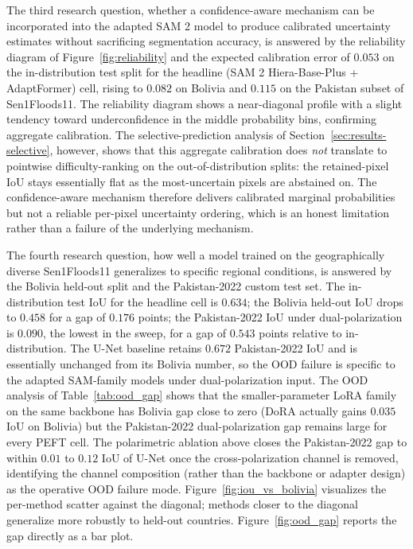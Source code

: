 \documentclass[11pt,a4paper,oneside]{report}
\begin{document}
The third research question, whether a confidence-aware mechanism can be incorporated into the adapted SAM 2 model to produce calibrated uncertainty estimates without sacrificing segmentation accuracy, is answered by the reliability diagram of Figure~\ref{fig:reliability} and the expected calibration error of $0.053$ on the in-distribution test split for the headline (SAM 2 Hiera-Base-Plus + AdaptFormer) cell, rising to $0.082$ on Bolivia and $0.115$ on the Pakistan subset of Sen1Floods11. The reliability diagram shows a near-diagonal profile with a slight tendency toward underconfidence in the middle probability bins, confirming aggregate calibration. The selective-prediction analysis of Section~\ref{sec:results-selective}, however, shows that this aggregate calibration does \emph{not} translate to pointwise difficulty-ranking on the out-of-distribution splits: the retained-pixel IoU stays essentially flat as the most-uncertain pixels are abstained on. The confidence-aware mechanism therefore delivers calibrated marginal probabilities but not a reliable per-pixel uncertainty ordering, which is an honest limitation rather than a failure of the underlying mechanism.

{\sloppy The fourth research question, how well a model trained on the geographically diverse Sen1Floods11 generalizes to specific regional conditions, is answered by the Bolivia held-out split and the Pakistan-2022 custom test set. The in-distribution test IoU for the headline cell is $0.634$; the Bolivia held-out IoU drops to $0.458$ for a gap of $0.176$ points; the Pakistan-2022 IoU under dual-polarization is $0.090$, the lowest in the sweep, for a gap of $0.543$ points relative to in-distribution. The U-Net baseline retains $0.672$ Pakistan-2022 IoU and is essentially unchanged from its Bolivia number, so the OOD failure is specific to the adapted SAM-family models under dual-polarization input. The OOD analysis of Table~\ref{tab:ood_gap} shows that the smaller-parameter LoRA family on the same backbone has Bolivia gap close to zero (DoRA actually gains $0.035$ IoU on Bolivia) but the Pakistan-2022 dual-polarization gap remains large for every PEFT cell. The polarimetric ablation above closes the Pakistan-2022 gap to within $0.01$ to $0.12$ IoU of U-Net once the cross-polarization channel is removed, identifying the channel composition (rather than the backbone or adapter design) as the operative OOD failure mode. Figure~\ref{fig:iou_vs_bolivia} visualizes the per-method scatter against the diagonal; methods closer to the diagonal generalize more robustly to held-out countries. Figure~\ref{fig:ood_gap} reports the gap directly as a bar plot.\par}
\end{document}
